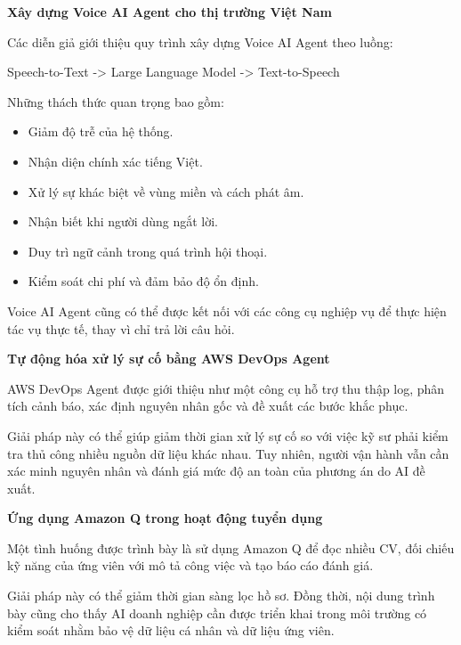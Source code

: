 \vspace{0.5em}\noindent\textbf{Xây dựng Voice AI Agent cho thị trường Việt
Nam}\par

Các diễn giả giới thiệu quy trình xây dựng Voice AI Agent theo luồng:

Speech-to-Text -\textgreater{} Large Language Model -\textgreater{}
Text-to-Speech

Những thách thức quan trọng bao gồm:

\begin{itemize}
\tightlist
\item
  Giảm độ trễ của hệ thống.
\item
  Nhận diện chính xác tiếng Việt.
\item
  Xử lý sự khác biệt về vùng miền và cách phát âm.
\item
  Nhận biết khi người dùng ngắt lời.
\item
  Duy trì ngữ cảnh trong quá trình hội thoại.
\item
  Kiểm soát chi phí và đảm bảo độ ổn định.
\end{itemize}

Voice AI Agent cũng có thể được kết nối với các công cụ nghiệp vụ để
thực hiện tác vụ thực tế, thay vì chỉ trả lời câu hỏi.

\vspace{0.5em}\noindent\textbf{Tự động hóa xử lý sự cố bằng AWS DevOps
Agent}\par

AWS DevOps Agent được giới thiệu như một công cụ hỗ trợ thu thập log,
phân tích cảnh báo, xác định nguyên nhân gốc và đề xuất các bước khắc
phục.

Giải pháp này có thể giúp giảm thời gian xử lý sự cố so với việc kỹ sư
phải kiểm tra thủ công nhiều nguồn dữ liệu khác nhau. Tuy nhiên, người
vận hành vẫn cần xác minh nguyên nhân và đánh giá mức độ an toàn của
phương án do AI đề xuất.

\vspace{0.5em}\noindent\textbf{Ứng dụng Amazon Q trong hoạt động tuyển
dụng}\par

Một tình huống được trình bày là sử dụng Amazon Q để đọc nhiều CV, đối
chiếu kỹ năng của ứng viên với mô tả công việc và tạo báo cáo đánh giá.

Giải pháp này có thể giảm thời gian sàng lọc hồ sơ. Đồng thời, nội dung
trình bày cũng cho thấy AI doanh nghiệp cần được triển khai trong môi
trường có kiểm soát nhằm bảo vệ dữ liệu cá nhân và dữ liệu ứng viên.

